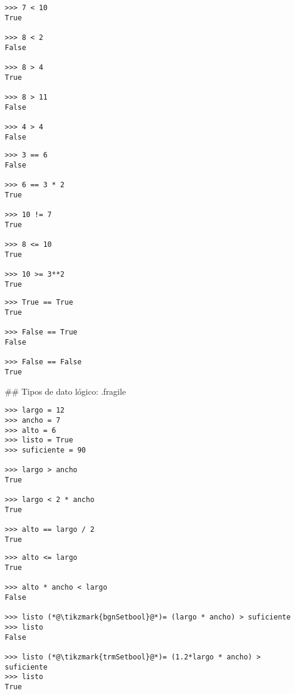 \bgncolumns


\begin{lstlisting}
>>> 7 < 10
True

>>> 8 < 2
False

>>> 8 > 4
True

>>> 8 > 11
False

>>> 4 > 4
False
\end{lstlisting}


\begin{lstlisting}
>>> 3 == 6
False

>>> 6 == 3 * 2
True

>>> 10 != 7
True

>>> 8 <= 10
True

>>> 10 >= 3**2
True
\end{lstlisting}


\begin{lstlisting}
>>> True == True
True

>>> False == True
False

>>> False == False
True
\end{lstlisting}

\trmcolumns


## Tipos de dato lógico: {.fragile}


\vspace{-3ex}

\bgncolumns


\begin{lstlisting}
>>> largo = 12
>>> ancho = 7
>>> alto = 6
>>> listo = True
>>> suficiente = 90

>>> largo > ancho
True

>>> largo < 2 * ancho
True

>>> alto == largo / 2
True
\end{lstlisting}


\begin{lstlisting}
>>> alto <= largo
True

>>> alto * ancho < largo
False

>>> listo (*@\tikzmark{bgnSetbool}@*)= (largo * ancho) > suficiente
>>> listo
False

>>> listo (*@\tikzmark{trmSetbool}@*)= (1.2*largo * ancho) > suficiente
>>> listo
True
\end{lstlisting}

